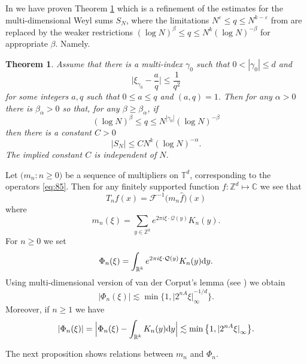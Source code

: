 \documentclass[a4paper,oneside]{amsart}
\theoremstyle{plain}
\newtheorem{theorem}{Theorem}
\theoremstyle{definition}
\numberwithin{equation}{section}
\newcounter{thm}
\theoremstyle{plain}
\newcommand{\RR}{\mathbb{R}}
\newcommand{\ZZ}{\mathbb{Z}}
\newcommand{\TT}{\mathbb{T}}
\newcommand{\CC}{\mathbb{C}}
\newcommand{\calQ}{\mathcal{Q}}
\newcommand{\calF}{\mathcal{F}}
\newcommand{\seq}[2]{{#1}: {#2}}
\newcommand{\norm}[1]{{\left\lvert #1 \right\rvert}}
\newcommand{\sprod}[2] {{#1 \cdot #2}}
\newcommand{\abs}[1]{{\lvert {#1} \rvert}}
\newcommand{\8}{\infty}
\begin{document}
In \cite{mst1} we have proven Theorem \ref{thm:3} which is a  refinement of the estimates for the
multi-dimensional Weyl sums $S_N$, where the limitations $N^\varepsilon \leq q \leq
  N^{k-\varepsilon}$ from
  \cite[Proposition 3]{SW0} are replaced by the weaker restrictions
  $(\log{N})^\beta \leq q \leq N^k(\log{N})^{-\beta}$ for 
  appropriate $\beta$. Namely.

\begin{theorem}
	\label{thm:3}
        Assume that there is a multi-index $\gamma_0$ such that $0 < \norm{\gamma_0} \leq d$ and
	\[
		\Big\lvert
		\xi_{\gamma_0} - \frac{a}{q}
		\Big\rvert
		\leq
		\frac{1}{q^2}
	\]
        for some integers $a, q$ such that $0\le a\le q$ and $(a, q) =
        1$. Then for any $\alpha>0$ there is  $\beta_{\alpha}>0$ so that, for any
        $\beta\ge \beta_{\alpha}$, if
	\begin{equation}
		\label{eq:57}
		(\log N)^\beta \leq q \leq N^{\norm{\gamma_0}} (\log N)^{-\beta}
	\end{equation}
        then there is a constant $C>0$ 
	\begin{equation}
		\label{eq:56}
		|S_N|
		\leq
		C
		N^k (\log N)^{-\alpha}.
	\end{equation}
	The implied  constant $C$ is independent of $N$. 
\end{theorem}



Let $\big(\seq{m_n}{n \geq 0}\big)$ be a sequence of
multipliers on $\TT^d$, corresponding to the operators
\eqref{eq:85}.  
Then for any finitely supported function  $f:\ZZ^d\mapsto\CC$ we see that
$$
T_nf(x)=\calF^{-1} \big(m_n \hat{f}\big)(x)
$$
where 
$$
m_n(\xi) = \sum_{y \in \ZZ^k} e^{2\pi i \sprod{\xi}{\calQ(y)}} K_n(y).
$$
For $n \geq 0$ we set
$$
\Phi_n(\xi) = \int_{\RR^k} e^{2\pi i \sprod{\xi}{\calQ(y)}} K_n(y) {\rm d}y.
$$
Using multi-dimensional version of van der Corput's lemma (see \cite[Propositon 2.1]{sw})
we obtain
\begin{equation}
	\label{eq:18}
	\lvert \Phi_n(\xi) \rvert
	\lesssim
	\min\big\{1, \abs{2^{n A} \xi}_{\infty}^{-1/d}\big\}.
\end{equation}
Moreover, if $n \geq 1$ we have
\begin{equation}
	\label{eq:19}
	\lvert \Phi_n(\xi) \rvert
	=
	\Big\lvert
	\Phi_n(\xi) - \int_{\RR^k} K_n(y) {\rm d}y
	\Big\rvert
	\lesssim
	\min\big\{1, \abs{2^{nA} \xi}_{\infty} \big\}.
\end{equation}

The next proposition shows relations between $m_n$ and $\Phi_n$. 
\end{document}
